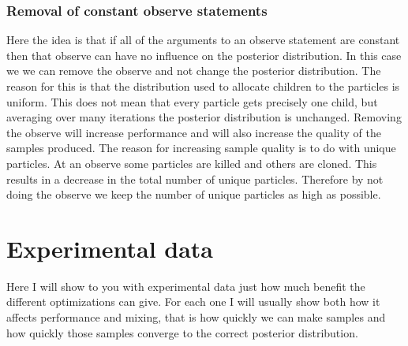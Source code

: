 \documentclass[a4paper]{article}
\begin{document}
\subsubsection{Removal of constant observe statements}

Here the idea is that if all of the arguments to an observe statement are constant then that observe can have no influence on the posterior distribution. In this case we we can remove the observe and not change the posterior distribution. The reason for this is that the distribution used to allocate children to the particles is uniform. This does not mean that every particle gets precisely one child, but averaging over many iterations the posterior distribution is unchanged. Removing the observe will increase performance and will also increase the quality of the samples produced. The reason for increasing sample quality is to do with unique particles. At an observe some particles are killed and others are cloned. This results in a decrease in the total number of unique particles. Therefore by not doing the observe we keep the number of unique particles as high as possible.




\section{Experimental data}

Here I will show to you with experimental data just how much benefit the different optimizations can give. For each one I will usually show both how it affects performance and mixing, that is how quickly we can make samples and how quickly those samples converge to the correct posterior distribution.



\end{document}
